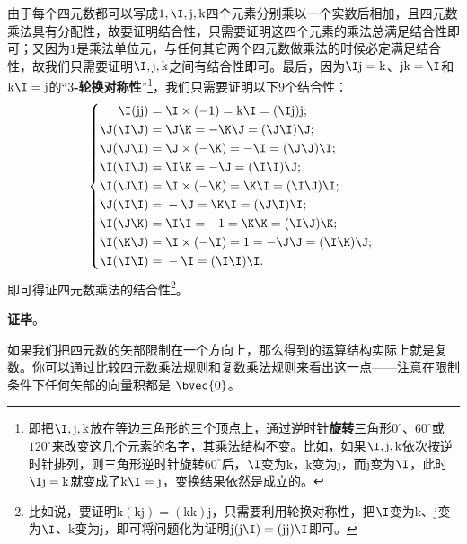 由于每个四元数都可以写成$1, \I, \mathrm{j}, \mathrm{k}$四个元素分别乘以一个实数后相加，且四元数乘法具有分配性，故要证明结合性，只需要证明这四个元素的乘法总满足结合性即可；又因为$1$是乘法单位元，与任何其它两个四元数做乘法的时候必定满足结合性，故我们只需要证明$\I, \mathrm{j}, \mathrm{k}$之间有结合性即可。最后，因为$\I\mathrm{j}=\mathrm{k}$、$\mathrm{j}\mathrm{k}=\I$和$\mathrm{k}\I=\mathrm{j}$的“\textbf{$3$-轮换对称性}”\footnote{即把$\I, \mathrm{j}, \mathrm{k}$放在等边三角形的三个顶点上，通过逆时针\textbf{旋转}三角形$0^\circ$、$60^\circ$或$120^\circ$来改变这几个元素的名字，其乘法结构不变。比如，如果$\I, \mathrm{j}, \mathrm{k}$依次按逆时针排列，则三角形逆时针旋转$60^\circ$后，$\I$变为$\mathrm{k}$，$\mathrm{k}$变为$\mathrm{j}$，而$\mathrm{j}$变为$\I$，此时$\I\mathrm{j}=\mathrm{k}$就变成了$\mathrm{k}\I=\mathrm{j}$，变换结果依然是成立的。}，我们只需要证明以下$9$个结合性：
\begin{equation}
\left\{
    \begin{aligned}
        \I(\mathrm{j}\mathrm{j}) ={}& \I\times(-1) = \mathrm{k}\I = (\I\mathrm{j})\mathrm{j}; \\
        \J(\I\J) ={}& \J\K = -\K\J = (\J\I)\J; \\
        \J(\J\I) ={}& \J\times(-\K) = -\I = (\J\J)\I; \\
        \I(\I\J) ={}& \I\K = -\J = (\I\I)\J; \\
        \I(\J\I) ={}& \I\times(-\K) = \K\I = (\I\J)\I; \\
        \J(\I\I) ={}& -\J = \K\I = (\J\I)\I; \\
        \I(\J\K) ={}& \I\I = -1 = \K\K = (\I\J)\K; \\
        \I(\K\J) ={}& \I\times(-\I) = 1 = -\J\J = (\I\K)\J; \\
        \I(\I\I) ={}& -\I = (\I\I)\I. 
    \end{aligned}
\right. ~
\end{equation}
即可得证四元数乘法的结合性\footnote{比如说，要证明$\mathrm{k}(\mathrm{k}\mathrm{j})=(\mathrm{k}\mathrm{k})\mathrm{j}$，只需要利用轮换对称性，把$\I$变为$\mathrm{k}$、$\mathrm{j}$变为$\I$、$\mathrm{k}$变为$\mathrm{j}$，即可将问题化为证明$\mathrm{j}(\mathrm{j}\I)=(\mathrm{j}\mathrm{j})\I$即可。}。

\textbf{证毕}。





如果我们把四元数的矢部限制在一个方向上，那么得到的运算结构实际上就是复数。你可以通过比较四元数乘法规则和复数乘法规则来看出这一点——注意在限制条件下任何矢部的向量积都是 $\bvec{0}$。

